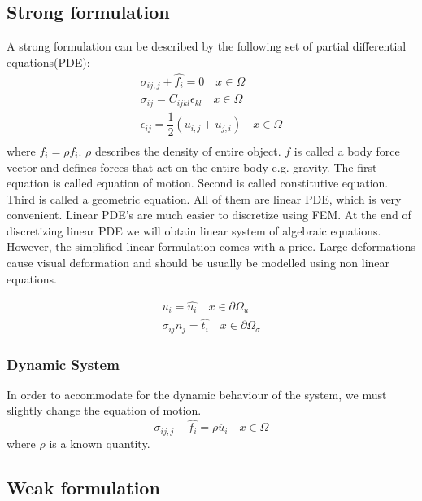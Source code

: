 \documentclass[en]{minipw} %
\begin{document}
\subsection{Strong formulation}
A strong formulation can be described by the following set of partial differential equations(PDE):
\begin{equation}
\begin{aligned}
\sigma_{ij,j} + \hat{f_{i}} = 0 \quad x \in \Omega
\\
\sigma_{ij} = C_{ijkl} \epsilon_{kl} \quad x \in \Omega
\\
\epsilon_{ij} = \dfrac{1}{2}(u_{i,j} + u_{j,i}) \quad x \in \Omega
\\
\end{aligned}
\end{equation}
where $\hat{f_{i}} = \rho f_i$. $\rho$ describes the density of entire object. $f$ is called a body force vector and defines forces that act on the entire body e.g. gravity. The first equation is called equation of motion. Second is called constitutive equation. Third is called a geometric equation. All of them are linear  PDE, which is very convenient. Linear PDE's are much easier to discretize using FEM. At the end of discretizing linear PDE we will obtain linear system of algebraic equations. However, the simplified linear formulation comes with a price. Large deformations cause visual deformation and should be usually be modelled using non linear equations.

\begin{equation}
\begin{aligned}
u_i = \hat{u_i} \quad x \in \partial  \Omega_{u}
\\
\sigma_{ij} n_{j} = \hat{t_i} \quad x \in \partial \Omega_{\sigma}
\end{aligned}
\end{equation}

\subsubsection{Dynamic System}
In order to accommodate for the dynamic behaviour of the system, we must slightly change the equation of motion.
\begin{equation}
\label{eq:motion_dynamic}
\sigma_{ij,j} + \hat{f_{i}} = \rho \ddot{u_i} \quad x \in \Omega
\end{equation}
where $\rho$ is a known quantity.

\subsection{Weak formulation}
\end{document}
